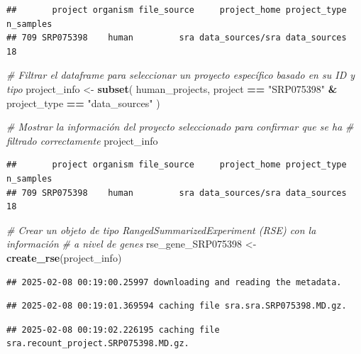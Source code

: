 \documentclass[
]{article}
\newenvironment{Shaded}{\begin{snugshade}}{\end{snugshade}}
\newcommand{\CommentTok}[1]{\textcolor[rgb]{0.56,0.35,0.01}{\textit{#1}}}
\newcommand{\FunctionTok}[1]{\textcolor[rgb]{0.13,0.29,0.53}{\textbf{#1}}}
\newcommand{\NormalTok}[1]{#1}
\newcommand{\OtherTok}[1]{\textcolor[rgb]{0.56,0.35,0.01}{#1}}
\newcommand{\SpecialCharTok}[1]{\textcolor[rgb]{0.81,0.36,0.00}{\textbf{#1}}}
\newcommand{\StringTok}[1]{\textcolor[rgb]{0.31,0.60,0.02}{#1}}
\begin{document}
\begin{verbatim}
##       project organism file_source     project_home project_type n_samples
## 709 SRP075398    human         sra data_sources/sra data_sources        18
\end{verbatim}

\begin{Shaded}
\begin{Highlighting}[]
\CommentTok{\# Filtrar el dataframe para seleccionar un proyecto específico basado en su ID y tipo}
\NormalTok{project\_info }\OtherTok{\textless{}{-}} \FunctionTok{subset}\NormalTok{(}
\NormalTok{  human\_projects,}
\NormalTok{  project }\SpecialCharTok{==} \StringTok{"SRP075398"} \SpecialCharTok{\&}\NormalTok{ project\_type }\SpecialCharTok{==} \StringTok{"data\_sources"}
\NormalTok{)}

\CommentTok{\# Mostrar la información del proyecto seleccionado para confirmar que se ha}
\CommentTok{\# filtrado correctamente}
\NormalTok{project\_info}
\end{Highlighting}
\end{Shaded}

\begin{verbatim}
##       project organism file_source     project_home project_type n_samples
## 709 SRP075398    human         sra data_sources/sra data_sources        18
\end{verbatim}

\begin{Shaded}
\begin{Highlighting}[]
\CommentTok{\# Crear un objeto de tipo RangedSummarizedExperiment (RSE) con la información}
\CommentTok{\# a nivel de genes}
\NormalTok{rse\_gene\_SRP075398 }\OtherTok{\textless{}{-}} \FunctionTok{create\_rse}\NormalTok{(project\_info)}
\end{Highlighting}
\end{Shaded}

\begin{verbatim}
## 2025-02-08 00:19:00.25997 downloading and reading the metadata.
\end{verbatim}

\begin{verbatim}
## 2025-02-08 00:19:01.369594 caching file sra.sra.SRP075398.MD.gz.
\end{verbatim}

\begin{verbatim}
## 2025-02-08 00:19:02.226195 caching file sra.recount_project.SRP075398.MD.gz.
\end{verbatim}
\end{document}
